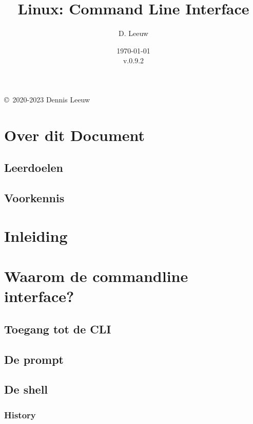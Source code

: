 \documentclass[a4paper,12pt,twoside,openright,titlepage]{book}
\author{D. Leeuw}
\title{Linux: Command Line Interface}
\date{\today\\v.0.9.2}
\begin{document}

\maketitle

\copyright\ 2020-2023 Dennis Leeuw\\




\frontmatter
\chapter{Over dit Document}
\section{Leerdoelen}

\section{Voorkennis}

%
%

\tableofcontents

\mainmatter
\chapter{Inleiding}


\chapter{Waarom de commandline interface?}

\section{Toegang tot de CLI}

\section{De prompt}

\section{De shell}

\subsection{History}

\end{document}
